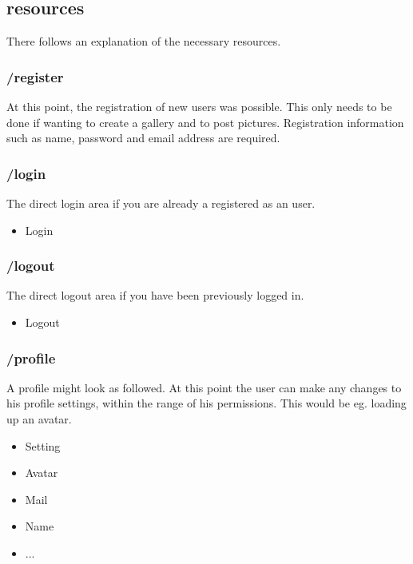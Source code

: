 \documentclass[a4paper,12pt,oneside]{article} %
\begin{document}
\subsection{resources }

There follows an explanation of the necessary resources.


\subsubsection{/register}

At this point, the registration of new users was possible. This only
needs to be done if wanting to create a gallery and to post pictures.
Registration information such as name, password and email address
are required.


\subsubsection{/login}

The direct login area if you are already a registered as an user.
\begin{itemize}
\item Login
\end{itemize}

\subsubsection{/logout}

The direct logout area if you have been previously logged in.
\begin{itemize}
\item Logout
\end{itemize}

\subsubsection{/profile}

A profile might look as followed. At this point the user can make any 
changes to his profile settings, within the range of his permissions. 
This would be eg. loading up an avatar.
\begin{itemize}
\item Setting
\item Avatar
\item Mail
\item Name
\item ...
\end{itemize}
\end{document}
